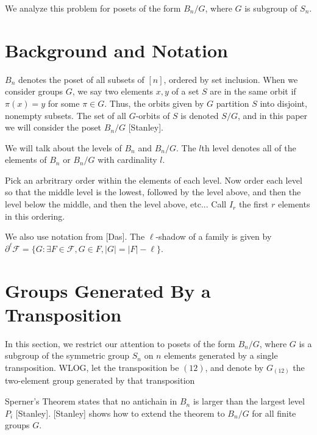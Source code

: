 \documentclass[12pt]{article}
\theoremstyle{plain}
\theoremstyle{definition}
\theoremstyle{remark}
\newcommand{\F}{\mathcal{F}}
\begin{document}
We analyze this problem for posets of the form $B_n / G$, where $G$ is subgroup of $S_n$.


\section{Background and Notation}


$B_n$ denotes the poset of all subsets of $[n]$, ordered by set inclusion. When we consider groups $G$, we say two elements $x, y$ of a set $S$ are in the same orbit if $\pi(x) = y$ for some $\pi \in G$. Thus, the orbits given by $G$ partition $S$ into disjoint, nonempty subsets. The set of all $G$-orbits of $S$ is denoted $S / G$, and in this paper we will consider the poset $B_n / G$ [Stanley]. 

We will talk about the levels of $B_n$ and $B_n/G$. The $l$th level denotes all of the elements of $B_n$ or $B_n/G$ with cardinality $l$. 

Pick an arbritrary order within the elements of each level. Now order each level so that the middle level is the lowest, followed by the level above, and then the level below the middle, and then the level above, etc... Call $I_r$ the first $r$ elements in this ordering. 


We also use notation from [Das]. The $\ell$-shadow of a family is given by $\partial^{\ell}\F = \{G: \exists F \in \F, G \in F, |G| = |F| - \ell\}$.


\section{Groups Generated By a Transposition}

In this section, we restrict our attention to posets of the form $B_n / G$, where $G$ is a subgroup of the symmetric group $S_n$ on $n$ elements generated by a single transposition. WLOG, let the transposition be $(12)$, and denote by $G_{(12)}$ the two-element group generated by that transposition

Sperner's Theorem states that no antichain in $B_n$ is larger than the largest level $P_i$ [Stanley]. [Stanley] shows how to extend the theorem to $B_n / G$ for all finite groups $G$. 
\end{document}
